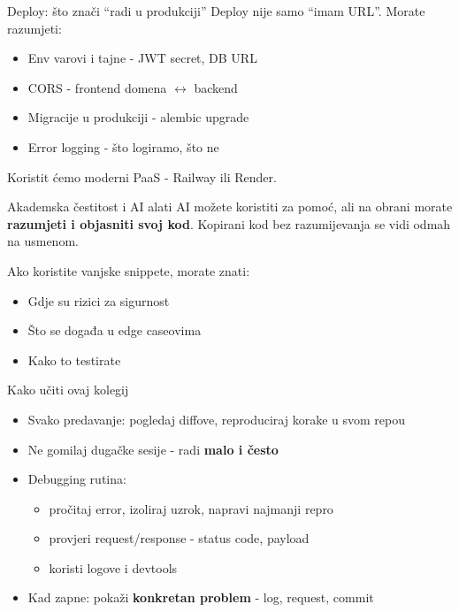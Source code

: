 \begin{frame}{Deploy: što znači \enquote{radi u produkciji}}
Deploy nije samo \enquote{imam URL}. Morate razumjeti:

\begin{itemize}
  \item Env varovi i tajne - JWT secret, DB URL
  \item CORS - frontend domena $\leftrightarrow$ backend
  \item Migracije u produkciji - alembic upgrade
  \item Error logging - što logiramo, što ne
\end{itemize}

\vspace{0.4em}
Koristit ćemo moderni PaaS - Railway ili Render.
\end{frame}

\begin{frame}{Akademska čestitost i AI alati}
AI možete koristiti za pomoć, ali na obrani morate \textbf{razumjeti i objasniti svoj kod}. Kopirani kod bez razumijevanja se vidi odmah na usmenom.

\vspace{0.4em}
Ako koristite vanjske snippete, morate znati:
\begin{itemize}
  \item Gdje su rizici za sigurnost
  \item Što se događa u edge caseovima
  \item Kako to testirate
\end{itemize}
\end{frame}

\begin{frame}{Kako učiti ovaj kolegij}
\begin{itemize}
  \item Svako predavanje: pogledaj diffove, reproduciraj korake u svom repou
  \item Ne gomilaj dugačke sesije - radi \textbf{malo i često}
  \item Debugging rutina:
    \begin{itemize}
      \item pročitaj error, izoliraj uzrok, napravi najmanji repro
      \item provjeri request/response - status code, payload
      \item koristi logove i devtools
    \end{itemize}
  \item Kad zapne: pokaži \textbf{konkretan problem} - log, request, commit
\end{itemize}
\end{frame}


